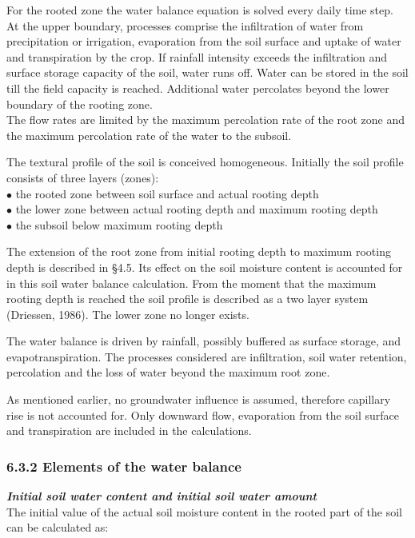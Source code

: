 \documentclass[11pt]{article}
\begin{document}
For the rooted zone the water balance equation is solved every daily time step. At the
upper boundary, processes comprise the infiltration of water from precipitation or
irrigation, evaporation from the soil surface and uptake of water and transpiration by the
crop. If rainfall intensity exceeds the infiltration and surface storage capacity of the soil,
water runs off. Water can be stored in the soil till the field capacity is reached. Additional
water percolates beyond the lower boundary of the rooting zone.\\
The flow rates are limited by the maximum percolation rate of the root zone and the
maximum percolation rate of the water to the subsoil.

The textural profile of the soil is conceived homogeneous. Initially the soil profile
consists of three layers (zones):\\
$\bullet$ the rooted zone between soil surface and actual rooting depth\\
$\bullet$ the lower zone between actual rooting depth and maximum rooting depth\\
$\bullet$ the subsoil below maximum rooting depth

The extension of the root zone from initial rooting depth to maximum rooting depth is
described in \S 4.5. Its effect on the soil moisture content is accounted for in this soil water
balance calculation. From the moment that the maximum rooting depth is reached the soil
profile is described as a two layer system (Driessen, 1986). The lower zone no longer
exists.

The water balance is driven by rainfall, possibly buffered as surface storage, and
evapotranspi\-ration. The processes considered are infiltration, soil water retention,
percolation and the loss of water beyond the maximum root zone.

As mentioned earlier, no groundwater influence is assumed, therefore capillary rise is not
accounted for. Only downward flow, evaporation from the soil surface and transpiration
are included in the calcula\-tions. 

\newpage

\subsubsection{  6.3.2 Elements of the water balance  }

\bigskip
\bigskip
{\it {\bf Initial soil water content and initial soil water amount}\/}\\
The initial value of the actual soil moisture content in the rooted part of the soil can be
calculated as:
\end{document}
